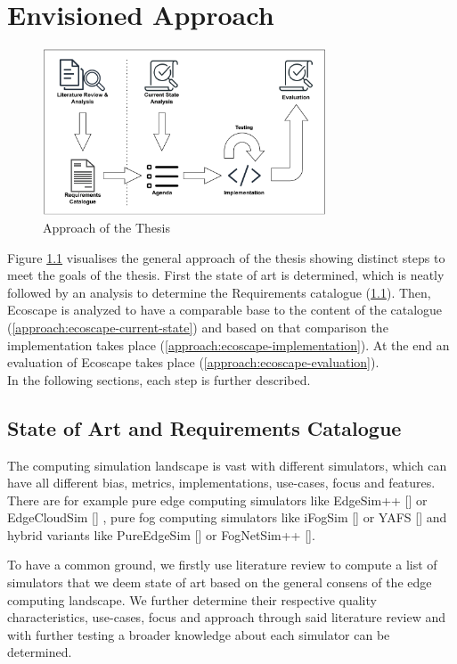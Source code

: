 \chapter{Envisioned Approach}
\begin{figure}[H]
  \centering
  \includegraphics[width=0.75\textwidth]{img/approach_figure.pdf}
  \caption{Approach of the Thesis}
  \label{fig:approach_figure}
\end{figure}

Figure \ref{fig:approach_figure} visualises the general approach of the thesis showing distinct steps to meet the goals of the thesis.
First the state of art is determined, which is neatly followed by an analysis to determine the Requirements catalogue (\ref{approach:state-of-art}).
Then, Ecoscape is analyzed to have a comparable base to the content of the catalogue (\ref{approach:ecoscape-current-state}) and based on that comparison the implementation takes place (\ref{approach:ecoscape-implementation}).
At the end an evaluation of Ecoscape takes place (\ref{approach:ecoscape-evaluation}).
\\
In the following sections, each step is further described.
\section{State of Art and Requirements Catalogue}\label{approach:state-of-art}
The computing simulation landscape is vast with different simulators, which can have all different bias, metrics, implementations, use-cases, focus and features.
There are for example pure edge computing simulators like EdgeSim++ [\cite{10612841}] or EdgeCloudSim [\cite{10.1002/ett.3493}] , pure fog computing simulators like iFogSim [\cite{gupta2016ifogsimtoolkitmodelingsimulation}] or YAFS [\cite{8758823}] and hybrid variants like PureEdgeSim [\cite{9188059}] or FogNetSim++ [\cite{8502760}].

To have a common ground, we firstly use literature review to compute a list of simulators that we deem state of art based on the general consens of the edge computing landscape.
We further determine their respective quality characteristics, use-cases, focus and approach through said literature review and with further testing a broader knowledge about each simulator can be determined.

